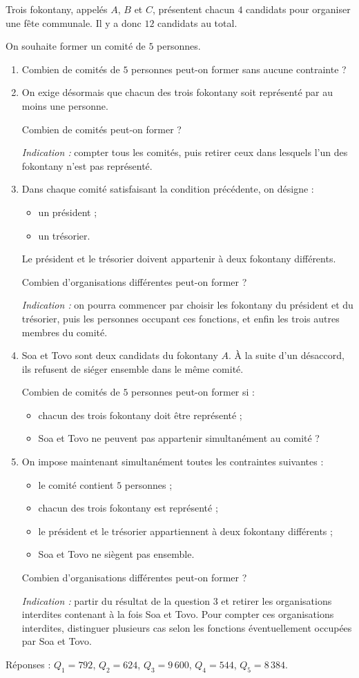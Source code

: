 Trois fokontany, appelés $A$, $B$ et $C$, présentent chacun $4$ candidats
pour organiser une fête communale. Il y a donc $12$ candidats au total.

On souhaite former un comité de $5$ personnes.
\begin{enumerate}
  \item Combien de comités de $5$ personnes peut-on former sans aucune
  contrainte ?
  \item On exige désormais que chacun des trois fokontany soit représenté par
  au moins une personne.

  Combien de comités peut-on former ?

  \emph{Indication :} compter tous les comités, puis retirer ceux dans
  lesquels l'un des fokontany n'est pas représenté.
  \item Dans chaque comité satisfaisant la condition précédente, on désigne :
  \begin{itemize}
    \item un président ;
    \item un trésorier.
  \end{itemize}
  Le président et le trésorier doivent appartenir à deux fokontany
  différents.

  Combien d'organisations différentes peut-on former ?

  \emph{Indication :} on pourra commencer par choisir les fokontany du
  président et du trésorier, puis les personnes occupant ces fonctions, et
  enfin les trois autres membres du comité.
  \item Soa et Tovo sont deux candidats du fokontany $A$. À la suite d'un
  désaccord, ils refusent de siéger ensemble dans le même comité.

  Combien de comités de $5$ personnes peut-on former si :
  \begin{itemize}
    \item chacun des trois fokontany doit être représenté ;
    \item Soa et Tovo ne peuvent pas appartenir simultanément au comité ?
  \end{itemize}
  \item On impose maintenant simultanément toutes les contraintes suivantes :
  \begin{itemize}
    \item le comité contient $5$ personnes ;
    \item chacun des trois fokontany est représenté ;
    \item le président et le trésorier appartiennent à deux fokontany
    différents ;
    \item Soa et Tovo ne siègent pas ensemble.
  \end{itemize}
  Combien d'organisations différentes peut-on former ?

  \emph{Indication :} partir du résultat de la question 3 et retirer les
  organisations interdites contenant à la fois Soa et Tovo. Pour compter ces
  organisations interdites, distinguer plusieurs cas selon les fonctions
  éventuellement occupées par Soa et Tovo.
\end{enumerate}

\medskip
Réponses : $Q_1 = 792$, $Q_2 = 624$, $Q_3 = 9\,600$, $Q_4 = 544$,
$Q_5 = 8\,384$.
